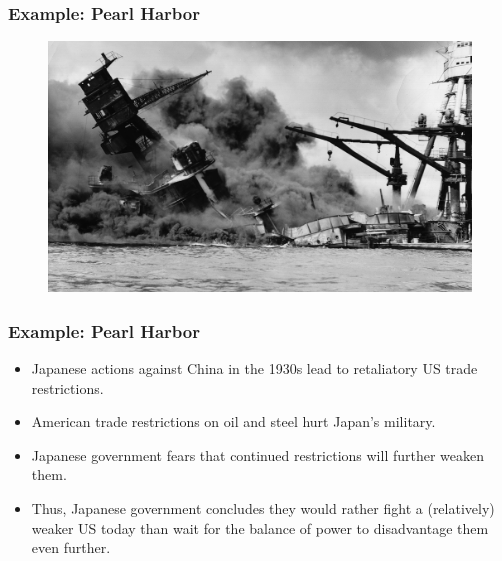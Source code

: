 \documentclass{beamer}
\begin{document}
\begin{frame} 
	\frametitle{\LARGE{Example: Pearl Harbor}}
	\begin{figure}[ht!]
		\centering
		\includegraphics[height=.9\textheight, keepaspectratio]{Pearlharbor.jpg}
	\end{figure}
\end{frame}

\begin{frame} 
	\frametitle{\LARGE{Example: Pearl Harbor}}
	\begin{itemize}
		\item Japanese actions against China in the 1930s lead to retaliatory US trade restrictions. \pause
		\item American trade restrictions on oil and steel hurt Japan's military. \pause
		\item Japanese government fears that continued restrictions will further weaken them. \pause
		\item Thus, Japanese government concludes they would rather fight a (relatively) weaker US today than wait for the balance of power to disadvantage them even further.
	\end{itemize}
\end{frame}
\end{document}
